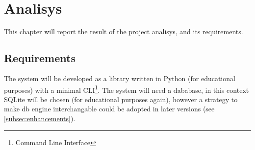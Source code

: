 \section{Analisys}
This chapter will report the result of the project analisys, and its requirements.

\subsection{Requirements}
The system will be developed as a library written in Python (for educational purposes) with a minimal CLI\footnote{Command Line Interface}. The system will need a dababase, in this context SQLite will be chosen (for educational purposes again), however a strategy to make db engine interchangable could be adopted in later versions (see \ref{subsec:enhancements}).

